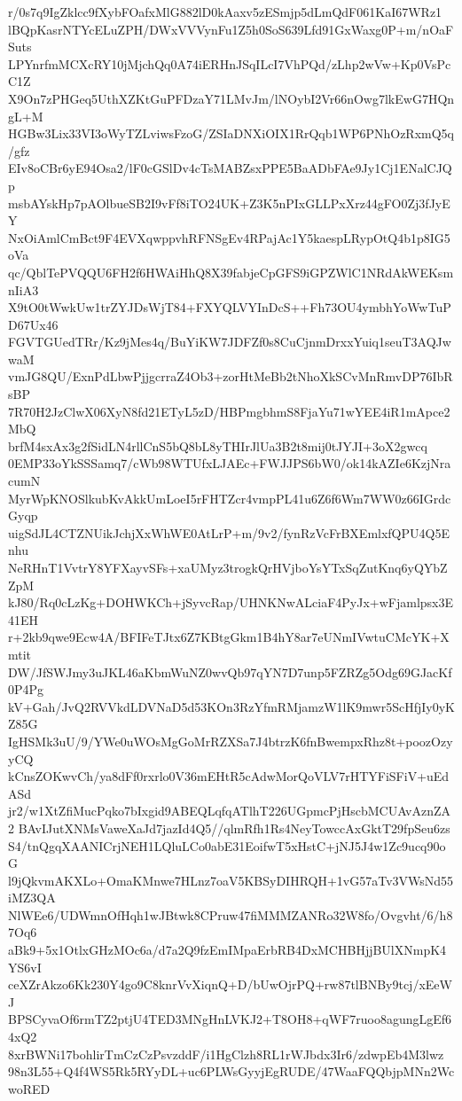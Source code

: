 r/0s7q9IgZklcc9fXybFOafxMlG882lD0kAaxv5zESmjp5dLmQdF061KaI67WRz1
lBQpKasrNTYcELuZPH/DWxVVVynFu1Z5h0SoS639Lfd91GxWaxg0P+m/nOaFSuts
LPYnrfmMCXcRY10jMjchQq0A74iERHnJSqILcI7VhPQd/zLhp2wVw+Kp0VsPcC1Z
X9On7zPHGeq5UthXZKtGuPFDzaY71LMvJm/lNOybI2Vr66nOwg7lkEwG7HQngL+M
HGBw3Lix33VI3oWyTZLviwsFzoG/ZSIaDNXiOIX1RrQqb1WP6PNhOzRxmQ5q/gfz
EIv8oCBr6yE94Osa2/lF0cGSlDv4cTsMABZsxPPE5BaADbFAe9Jy1Cj1ENalCJQp
msbAYskHp7pAOlbueSB2I9vFf8iTO24UK+Z3K5nPIxGLLPxXrz44gFO0Zj3fJyEY
NxOiAmlCmBct9F4EVXqwppvhRFNSgEv4RPajAc1Y5kaespLRypOtQ4b1p8IG5oVa
qc/QblTePVQQU6FH2f6HWAiHhQ8X39fabjeCpGFS9iGPZWlC1NRdAkWEKsmnIiA3
X9tO0tWwkUw1trZYJDsWjT84+FXYQLVYInDcS++Fh73OU4ymbhYoWwTuPD67Ux46
FGVTGUedTRr/Kz9jMes4q/BuYiKW7JDFZf0s8CuCjnmDrxxYuiq1seuT3AQJwwaM
vmJG8QU/ExnPdLbwPjjgcrraZ4Ob3+zorHtMeBb2tNhoXkSCvMnRmvDP76IbRsBP
7R70H2JzClwX06XyN8fd21ETyL5zD/HBPmgbhmS8FjaYu71wYEE4iR1mApce2MbQ
brfM4sxAx3g2fSidLN4rllCnS5bQ8bL8yTHIrJlUa3B2t8mij0tJYJI+3oX2gwcq
0EMP33oYkSSSamq7/cWb98WTUfxLJAEc+FWJJPS6bW0/ok14kAZIe6KzjNracumN
MyrWpKNOSlkubKvAkkUmLoeI5rFHTZcr4vmpPL41u6Z6f6Wm7WW0z66IGrdcGyqp
uigSdJL4CTZNUikJchjXxWhWE0AtLrP+m/9v2/fynRzVcFrBXEmlxfQPU4Q5Enhu
NeRHnT1VvtrY8YFXayvSFs+xaUMyz3trogkQrHVjboYsYTxSqZutKnq6yQYbZZpM
kJ80/Rq0cLzKg+DOHWKCh+jSyvcRap/UHNKNwALciaF4PyJx+wFjamlpsx3E41EH
r+2kb9qwe9Ecw4A/BFIFeTJtx6Z7KBtgGkm1B4hY8ar7eUNmIVwtuCMcYK+Xmtit
DW/JfSWJmy3uJKL46aKbmWuNZ0wvQb97qYN7D7unp5FZRZg5Odg69GJacKf0P4Pg
kV+Gah/JvQ2RVVkdLDVNaD5d53KOn3RzYfmRMjamzW1lK9mwr5ScHfjIy0yKZ85G
IgHSMk3uU/9/YWe0uWOsMgGoMrRZXSa7J4btrzK6fnBwempxRhz8t+poozOzyyCQ
kCnsZOKwvCh/ya8dFf0rxrlo0V36mEHtR5cAdwMorQoVLV7rHTYFiSFiV+uEdASd
jr2/w1XtZfiMucPqko7bIxgid9ABEQLqfqATlhT226UGpmcPjHscbMCUAvAznZA2
BAvIJutXNMsVaweXaJd7jazId4Q5//qlmRfh1Rs4NeyTowccAxGktT29fpSeu6zs
S4/tnQgqXAANICrjNEH1LQluLCo0abE31EoifwT5xHstC+jNJ5J4w1Zc9ucq90oG
l9jQkvmAKXLo+OmaKMnwe7HLnz7oaV5KBSyDIHRQH+1vG57aTv3VWsNd55iMZ3QA
NlWEe6/UDWmnOfHqh1wJBtwk8CPruw47fiMMMZANRo32W8fo/Ovgvht/6/h87Oq6
aBk9+5x1OtlxGHzMOc6a/d7a2Q9fzEmIMpaErbRB4DxMCHBHjjBUlXNmpK4YS6vI
ceXZrAkzo6Kk230Y4go9C8knrVvXiqnQ+D/bUwOjrPQ+rw87tlBNBy9tcj/xEeWJ
BPSCyvaOf6rmTZ2ptjU4TED3MNgHnLVKJ2+T8OH8+qWF7ruoo8agungLgEf64xQ2
8xrBWNi17bohlirTmCzCzPsvzddF/i1HgClzh8RL1rWJbdx3Ir6/zdwpEb4M3lwz
98n3L55+Q4f4WS5Rk5RYyDL+uc6PLWsGyyjEgRUDE/47WaaFQQbjpMNn2WcwoRED
